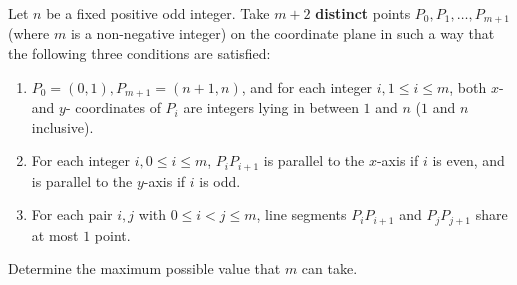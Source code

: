 Let $n$ be a fixed positive odd integer. Take $m+2$ \textbf{distinct} points $P_0,P_1,\ldots ,P_{m+1}$ (where $m$ is a non-negative integer) on the coordinate plane in such a way that the following three conditions are satisfied:
\begin{enumerate}[label=(\roman*)]
	\item $P_0=(0,1),P_{m+1}=(n+1,n)$, and for each integer $i,1\le i\le m$, both $x$- and $y$- coordinates of $P_i$ are integers lying in between $1$ and $n$ ($1$ and $n$ inclusive).
	\item For each integer $i,0\le i\le m$, $P_iP_{i+1}$ is parallel to the $x$-axis if $i$ is even, and is parallel to the $y$-axis if $i$ is odd.
	\item For each pair $i,j$ with $0\le i<j\le m$, line segments $P_iP_{i+1}$ and $P_jP_{j+1}$ share at most $1$ point.
\end{enumerate}
Determine the maximum possible value that $m$ can take.
